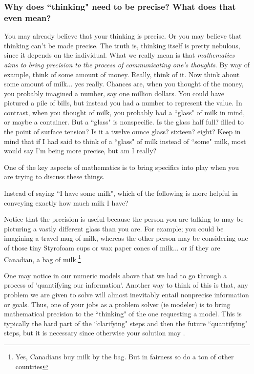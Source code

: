 \documentclass{ximeraXloud}
\begin{document}
\subsubsection*{Why does ``thinking" need to be precise? What does that even mean?}
    You may already believe that your thinking is precise. Or you may believe that thinking can't be made precise. The truth is, thinking itself is pretty nebulous, since it depends on the individual. What we really mean is that \textit{mathematics aims to bring precision to the process of communicating one's thoughts}. By way of example, think of some amount of money. Really, think of it. Now think about some amount of milk... yes really. Chances are, when you thought of the money, you probably imagined a number, say one million dollars. You could have pictured a pile of bills, but instead you had a number to represent the value. In contrast, when you thought of milk, you probably had a ``glass" of milk in mind, or maybe a container. But a ``glass" is nonspecific. Is the glass half full? filled to the point of surface tension? Is it a twelve ounce glass? sixteen? eight? Keep in mind that if I had said to think of a ``glass" of milk instead of ``some" milk, most would say I'm being more precise, but am I really?
    
    One of the key aspects of mathematics is to bring specifics into play when you are trying to discuss these things. 
    \begin{example}
        Instead of saying ``I have some milk", which of the following is more helpful in conveying exactly how much milk I have?
        \begin{multipleChoice} 
        \end{multipleChoice}
    \end{example}
    
    Notice that the precision is useful because the person you are talking to may be picturing a vastly different glass than you are. For example; you could be imagining a travel mug of milk, whereas the other person may be considering one of those tiny Styrofoam cups or wax paper cones of milk... or if they are Canadian, a bag of milk.\footnote{Yes, Canadians buy milk by the bag. But in fairness so do a ton of other countries}
    
    \begin{exploration}
        One may notice in our numeric models above that we had to go through a process of 'quantifying our information'. Another way to think of this is that, any problem we are given to solve will almost inevitably entail nonprecise information or goals. Thus, one of your jobs as a problem solver (ie modeler) is to bring mathematical precision to the ``thinking" of the one requesting a model. This is typically the hard part of the ``clarifying" steps and then the future ``quantifying" steps, but it is necessary since otherwise your solution may .
    \end{exploration}
\end{document}
